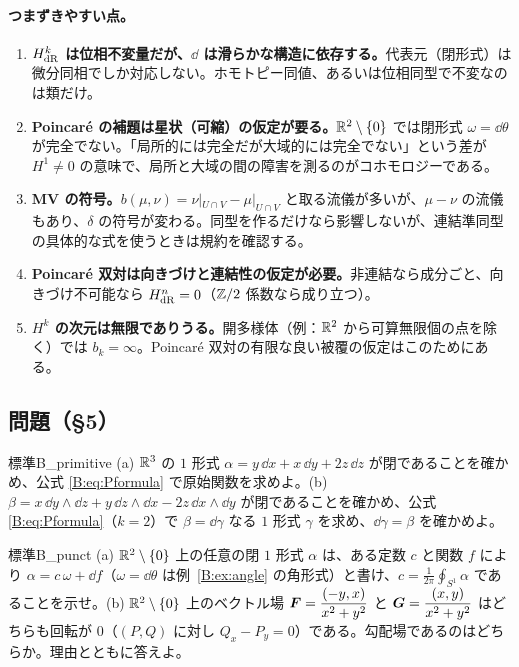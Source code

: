 \paragraph{つまずきやすい点。}
\begin{enumerate}
\item \textbf{$H^k_{\rm dR}$ は位相不変量だが、$\dd$ は滑らかな構造に依存する。}代表元（閉形式）は微分同相でしか対応しない。ホモトピー同値、あるいは位相同型で不変なのは類だけ。
\item \textbf{Poincaré の補題は星状（可縮）の仮定が要る。}$\mathbb R^2\setminus\{0\}$ では閉形式 $\omega=\dd\theta$ が完全でない。「局所的には完全だが大域的には完全でない」という差が $H^1\ne0$ の意味で、局所と大域の間の障害を測るのがコホモロジーである。
\item \textbf{MV の符号。}$b(\mu,\nu)=\nu|_{U\cap V}-\mu|_{U\cap V}$ と取る流儀が多いが、$\mu-\nu$ の流儀もあり、$\delta$ の符号が変わる。同型を作るだけなら影響しないが、連結準同型の具体的な式を使うときは規約を確認する。
\item \textbf{Poincaré 双対は向きづけと連結性の仮定が必要。}非連結なら成分ごと、向きづけ不可能なら $H^n_{\rm dR}=0$（$\mathbb Z/2$ 係数なら成り立つ）。
\item \textbf{$H^k$ の次元は無限でありうる。}開多様体（例：$\mathbb R^2$ から可算無限個の点を除く）では $b_k=\infty$。Poincaré 双対の有限な良い被覆の仮定はこのためにある。
\end{enumerate}

\subsection*{問題（§5）}

\begin{probl}{標準}{B_primitive}
(a) $\mathbb R^3$ の $1$ 形式 $\alpha=y\,\dd x+x\,\dd y+2z\,\dd z$ が閉であることを確かめ、公式 \eqref{B:eq:Pformula} で原始関数を求めよ。(b) $\beta=x\,\dd y\wedge\dd z+y\,\dd z\wedge\dd x-2z\,\dd x\wedge\dd y$ が閉であることを確かめ、公式 \eqref{B:eq:Pformula}（$k=2$）で $\beta=\dd\gamma$ なる $1$ 形式 $\gamma$ を求め、$\dd\gamma=\beta$ を確かめよ。
\end{probl}

\begin{probl}{標準}{B_punct}
(a) $\mathbb R^2\setminus\{0\}$ 上の任意の閉 $1$ 形式 $\alpha$ は、ある定数 $c$ と関数 $f$ により $\alpha=c\,\omega+\dd f$（$\omega=\dd\theta$ は例~\ref{B:ex:angle} の角形式）と書け、$c=\frac1{2\pi}\oint_{S^1}\alpha$ であることを示せ。(b) $\mathbb R^2\setminus\{0\}$ 上のベクトル場 $\boldsymbol F=\dfrac{(-y,x)}{x^2+y^2}$ と $\boldsymbol G=\dfrac{(x,y)}{x^2+y^2}$ はどちらも回転が $0$（$(P,Q)$ に対し $Q_x-P_y=0$）である。勾配場であるのはどちらか。理由とともに答えよ。
\end{probl}

